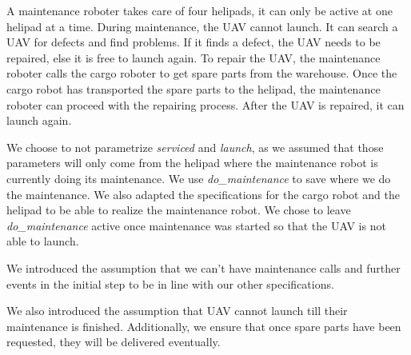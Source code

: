 \documentclass[	runningheads,
				a4paper]{llncs}
\begin{document}
A maintenance roboter takes care of four helipads, it can only be active at one helipad at a time.
During maintenance, the UAV cannot launch.
It can search a UAV for defects and find problems.
If it finds a defect, the UAV needs to be repaired, else it is free to launch again.
To repair the UAV, the maintenance roboter calls the cargo roboter to get spare parts from the warehouse.
Once the cargo robot has transported the spare parts to the helipad, the maintenance roboter can proceed with the repairing process. 
After the UAV is repaired, it can launch again.

We choose to not parametrize \textit{serviced} and \textit{launch}, as we assumed that those parameters will only come from the helipad where the maintenance robot is currently doing its maintenance.
We use \textit{do\_maintenance} to save where we do the maintenance.
We also adapted the specifications for the cargo robot and the helipad to be able to realize the maintenance robot.
We chose to leave \textit{do_maintenance} active once maintenance was started so that the UAV is not able to launch.


We introduced the assumption that we can't have maintenance calls and further events in the initial step to be in line with our other specifications.

We also introduced the assumption that UAV cannot launch till their maintenance is finished.
Additionally, we ensure that once spare parts have been requested, they will be delivered eventually.






	
\end{document}
